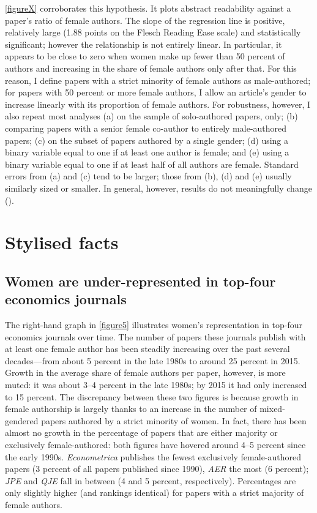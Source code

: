 \autoref{figureX} corroborates this hypothesis. It plots abstract readability against a paper's ratio of female authors. The slope of the regression line is positive, relatively large (1.88 points on the Flesch Reading Ease scale) and statistically significant; however the relationship is not entirely linear. In particular, it appears to be close to zero when women make up fewer than 50 percent of authors and increasing in the share of female authors only after that. For this reason, I define papers with a strict minority of female authors as male-authored; for papers with 50 percent or more female authors, I allow an article's gender to increase linearly with its proportion of female authors. For robustness, however, I also repeat most analyses (a) on the sample of solo-authored papers, only; (b) comparing papers with a senior female co-author to entirely male-authored papers; (c) on the subset of papers authored by a single gender; (d) using a binary variable equal to one if at least one author is female; and (e) using a binary variable equal to one if at least half of all authors are female. Standard errors from (a) and (c) tend to be larger; those from (b), (d) and (e) usually similarly sized or smaller. In general, however, results do not meaningfully change ().

\section{Stylised facts}
\label{stylisedfacts}

\subsection{Women are under-represented in top-four economics journals}
\label{underrepresentation}



The right-hand graph in \autoref{figure5} illustrates women's representation in top-four economics journals over time. The number of papers these journals publish with at least one female author has been steadily increasing over the past several decades---from about 5 percent in the late 1980s to around 25 percent in 2015. Growth in the average share of female authors per paper, however, is more muted: it was about 3--4 percent in the late 1980s; by 2015 it had only increased to 15 percent. The discrepancy between these two figures is because growth in female authorship is largely thanks to an increase in the number of mixed-gendered papers authored by a strict minority of women. In fact, there has been almost no growth in the percentage of papers that are either majority or exclusively female-authored: both figures have hovered around 4--5 percent since the early 1990s. \emph{Econometrica} publishes the fewest exclusively female-authored papers (3 percent of all papers published since 1990), \emph{AER} the most (6 percent); \emph{JPE} and \emph{QJE} fall in between (4 and 5 percent, respectively). Percentages are only slightly higher (and rankings identical) for papers with a strict majority of female authors.

